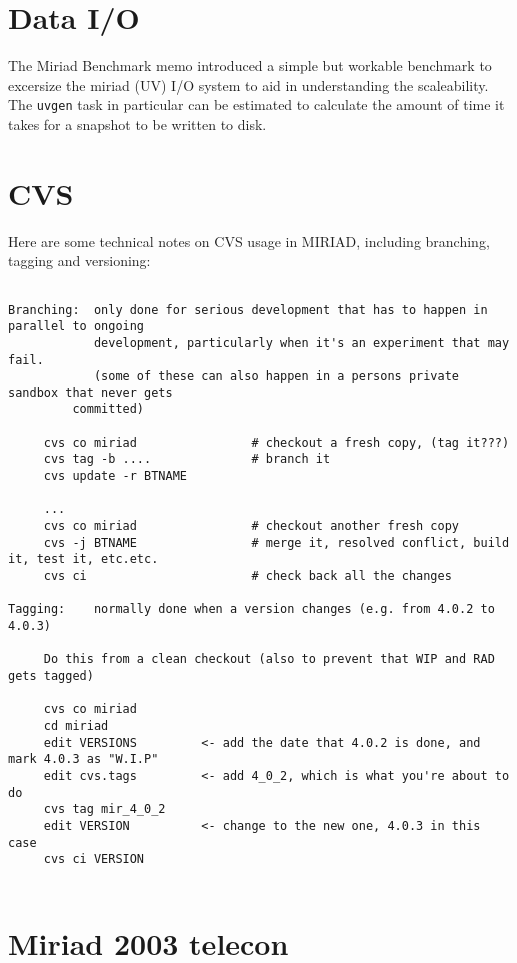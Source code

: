 \section{Data I/O}

The Miriad Benchmark memo introduced a simple but workable benchmark to excersize
the miriad (UV) I/O system to aid in understanding the scaleability. The
{\tt uvgen} task in particular can be estimated to calculate the amount
of time it takes for a snapshot to be written to disk.

\section{CVS}

Here are some technical notes on CVS usage in MIRIAD, including branching, tagging
and versioning:

\begin{verbatim}

Branching:  only done for serious development that has to happen in parallel to ongoing
            development, particularly when it's an experiment that may fail.
            (some of these can also happen in a persons private sandbox that never gets
	     committed)

     cvs co miriad                # checkout a fresh copy, (tag it???)
     cvs tag -b ....              # branch it
     cvs update -r BTNAME
     
     ...
     cvs co miriad                # checkout another fresh copy
     cvs -j BTNAME                # merge it, resolved conflict, build it, test it, etc.etc.
     cvs ci                       # check back all the changes

Tagging:    normally done when a version changes (e.g. from 4.0.2 to 4.0.3)

     Do this from a clean checkout (also to prevent that WIP and RAD gets tagged)

     cvs co miriad
     cd miriad
     edit VERSIONS         <- add the date that 4.0.2 is done, and mark 4.0.3 as "W.I.P"
     edit cvs.tags         <- add 4_0_2, which is what you're about to do
     cvs tag mir_4_0_2
     edit VERSION          <- change to the new one, 4.0.3 in this case
     cvs ci VERSION


\end{verbatim}

\section{Miriad 2003 telecon}

